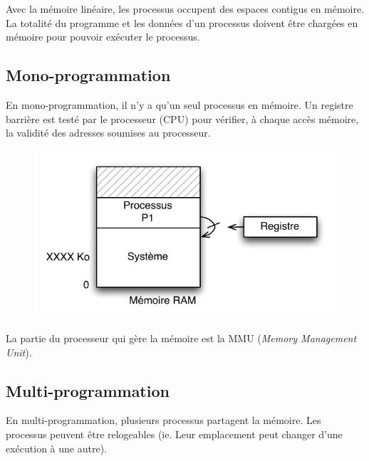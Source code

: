 \documentclass[11pt,english,french]{scrreprt}
\theoremstyle{remark}
\theoremstyle{definition}
\begin{document}
Avec la mémoire linéaire, les processus occupent des espaces contigus en mémoire. La totalité du programme et les données d'un processus doivent être chargées en mémoire pour pouvoir exécuter le processus. 

\subsection{Mono-programmation}
En mono-programmation, il n'y a qu'un seul processus en mémoire.
Un registre barrière est testé par le processeur (CPU) pour vérifier, à chaque accès mémoire, la validité des adresses soumises au processeur.

\begin{figure}[h!]
	\center
	\vspace{-10pt}
	\includegraphics[scale=.85]{img/mem-mono-prg}
\end{figure}

La partie du processeur qui gère la mémoire est la MMU (\emph{Memory Management Unit}).

\subsection{Multi-programmation}
En multi-programmation, plusieurs processus partagent la mémoire.
Les processus peuvent être relogeables (ie. Leur emplacement peut changer d'une exécution à une autre).
\end{document}
